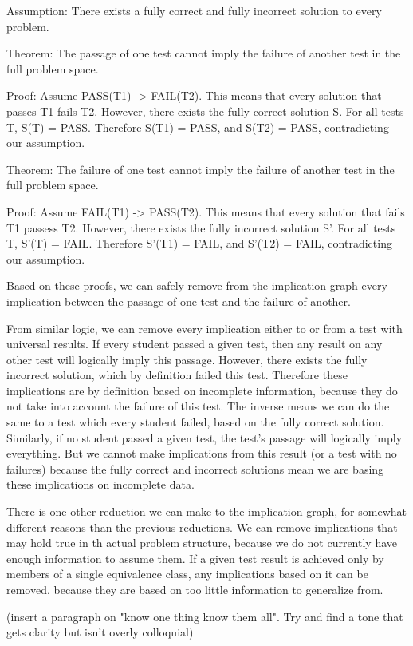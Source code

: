 \documentclass[11pt]{article}
\begin{document}
Assumption: There exists a fully correct and fully incorrect solution to every problem.

Theorem: The passage of one test cannot imply the failure of another test in the full problem space.

Proof: Assume PASS(T1) -> FAIL(T2). This means that every solution that passes T1 fails T2. However, there exists the fully correct solution S. For all tests T, S(T) = PASS. Therefore S(T1) = PASS, and S(T2) = PASS, contradicting our assumption.

Theorem: The failure of one test cannot imply the failure of another test in the full problem space.

Proof: Assume FAIL(T1) -> PASS(T2). This means that every solution that fails T1 passess T2. However, there exists the fully incorrect solution S'. For all tests T, S'(T) = FAIL. Therefore S'(T1) = FAIL, and S'(T2) = FAIL, contradicting our assumption.


Based on these proofs, we can safely remove from the implication graph every implication between the passage of one test and the failure of another.

From similar logic, we can remove every implication either to or from a test with universal results. If every student passed a given test, then any result on any other test will logically imply this passage. However, there exists the fully incorrect solution, which by definition failed this test. Therefore these implications are by definition based on incomplete information, because they do not take into account the failure of this test. The inverse means we can do the same to a test which every student failed, based on the fully correct solution. Similarly, if no student passed a given test, the  test's passage will logically imply everything. But we cannot make implications  from this result (or a test with no failures) because the fully correct and incorrect solutions mean we are basing these implications on incomplete data.

There is one other reduction we can make to the implication graph, for somewhat different reasons than the previous reductions. We can remove implications that may hold true in th actual problem structure, because we do not currently have enough information to assume them. If a given test result is achieved only by members of a single equivalence class, any implications based on it can be removed, because they are based on too little information to generalize from.

(insert a paragraph on "know one thing know them all". Try and  find a tone that gets clarity but isn't overly colloquial)
\end{document}
